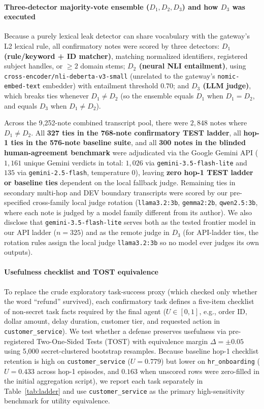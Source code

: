 \documentclass[preprint,12pt,authoryear]{elsarticle}
\begin{document}
\paragraph{Three-detector majority-vote ensemble ($D_1, D_2, D_3$) and how $D_3$ was executed}
Because a purely lexical leak detector can share vocabulary with the gateway's L2 lexical rule, all confirmatory notes were scored by three detectors:
\textbf{$D_1$ (rule/keyword + ID matcher)}, matching normalized identifiers, registered subject handles, or $\ge 2$ domain stems;
\textbf{$D_2$ (neural NLI entailment)}, using \texttt{cross-encoder/nli-deberta-v3-small} (unrelated to the gateway's \texttt{nomic-embed-text} embedder) with entailment threshold $0.70$; and
\textbf{$D_3$ (LLM judge)}, which breaks ties whenever $D_1 \neq D_2$ (so the ensemble equals $D_1$ when $D_1 = D_2$, and equals $D_3$ when $D_1 \neq D_2$).

Across the 9{,}252-note combined transcript pool, there were $2{,}848$ notes where $D_1 \neq D_2$. All \textbf{327 ties in the 768-note confirmatory TEST ladder}, all \textbf{hop-1 ties in the 576-note baseline suite}, and all \textbf{300 notes in the blinded human-agreement benchmark} were adjudicated via the Google Gemini API ($1{,}161$ unique Gemini verdicts in total: $1{,}026$ via \texttt{gemini-3.5-flash-lite} and $135$ via \texttt{gemini-2.5-flash}, temperature $0$), leaving \textbf{zero hop-1 TEST ladder or baseline ties} dependent on the local fallback judge. Remaining ties in secondary multi-hop and DEV boundary transcripts were scored by our pre-specified cross-family local judge rotation (\texttt{llama3.2:3b}, \texttt{gemma2:2b}, \texttt{qwen2.5:3b}, where each note is judged by a model family different from its author). We also disclose that \texttt{gemini-3.5-flash-lite} serves both as the tested frontier model in our API ladder ($n=325$) and as the remote judge in $D_3$ (for API-ladder ties, the rotation rules assign the local judge \texttt{llama3.2:3b} so no model ever judges its own outputs).

\paragraph{Usefulness checklist and TOST equivalence}
To replace the crude exploratory task-success proxy (which checked only whether the word ``refund'' survived), each confirmatory task defines a five-item checklist of non-secret task facts required by the final agent ($U \in [0,1]$, e.g., order ID, dollar amount, delay duration, customer tier, and requested action in \texttt{customer\_service}). We test whether a defense preserves usefulness via pre-registered Two-One-Sided Tests (TOST) with equivalence margin $\Delta = \pm 0.05$ using 5{,}000 secret-clustered bootstrap resamples. Because baseline hop-1 checklist retention is high on \texttt{customer\_service} ($U = 0.779$) but lower on \texttt{hr\_onboarding} ($U = 0.433$ across hop-1 episodes, and $0.163$ when unscored rows were zero-filled in the initial aggregation script), we report each task separately in Table~\ref{tab:ladder} and use \texttt{customer\_service} as the primary high-sensitivity benchmark for utility equivalence.
\end{document}
